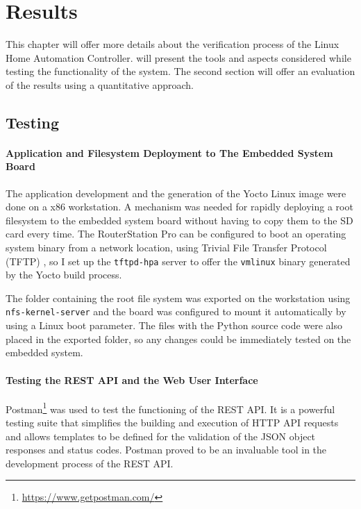 \chapter{Results}

This chapter will offer more details about the verification process of the Linux Home Automation Controller.  will present the tools and aspects considered while testing the functionality of the system. The second section will offer an evaluation of the results using a quantitative approach.

\section{Testing}
\label{sec:testing}

\subsubsection{Application and Filesystem Deployment to The Embedded System Board}
The application development and the generation of the Yocto Linux image were done on a x86 workstation. A mechanism was needed for rapidly deploying a root filesystem to the embedded system board without having to copy them to the SD card every time. The RouterStation Pro can be configured to boot an operating system binary from a network location, using Trivial File Transfer Protocol (TFTP) , so I set up the \texttt{tftpd-hpa} server to offer the \texttt{vmlinux} binary generated by the Yocto build process. 

The folder containing the root file system was exported on the workstation using \texttt{nfs-kernel-server} and the board was configured to mount it automatically by using a Linux boot parameter. The files with the Python source code were also placed in the exported folder, so any changes could be immediately tested on the embedded system.

\subsubsection{Testing the REST API and the Web User Interface}
Postman\footnote{\url{https://www.getpostman.com/}} was used to test the functioning of the REST API. It is a powerful testing suite that simplifies the building and execution of HTTP API requests and allows templates to be defined for the validation of the JSON object responses and status codes. Postman proved to be an invaluable tool in the development process of the REST API.

